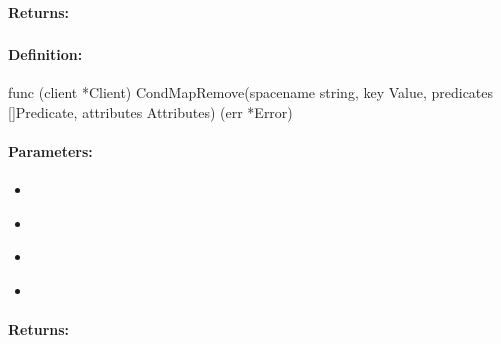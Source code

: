 \paragraph{Returns:}


\pagebreak
\subsubsection{}
\label{api:Go:CondMapRemove}


\paragraph{Definition:}
\begin{gocode}
func (client *Client) CondMapRemove(spacename string, key Value, predicates []Predicate, attributes Attributes) (err *Error)
\end{gocode}

\paragraph{Parameters:}
\begin{itemize}[noitemsep]
\item {}\\

\item {}\\

\item {}\\

\item {}\\

\end{itemize}

\paragraph{Returns:}


\pagebreak
\subsubsection{}
\label{api:Go:GroupMapRemove}


